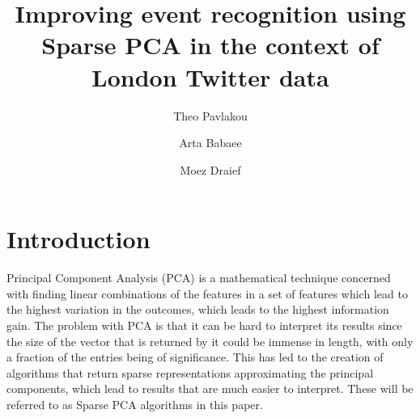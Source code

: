 \documentclass[graybox]{svmult}
\begin{document}
\title*{Improving event recognition using Sparse PCA  in the context of London Twitter data}
\author{Theo Pavlakou \and Arta Babaee \and Moez Draief}
%
%
\maketitle



\section{Introduction}\label{intro}
Principal Component Analysis (PCA) is a mathematical technique concerned with finding linear combinations of the features in a set of features which lead to the highest variation in the outcomes, which leads to the highest information gain. The problem with PCA is that it can be hard to interpret its results since the size of the vector that is returned by it could be immense in length, with only a fraction of the entries being of significance. This has led to the creation of algorithms that return sparse representations approximating the principal components, which lead to results that are much easier to interpret. These will be referred to as Sparse PCA algorithms in this paper. 
\end{document}
